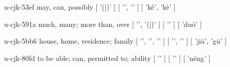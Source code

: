 \begin{multicols}{2}
\cjkgGlue{} u-cjk-53ef  may, can, possibly  [ '\cjkgGlue{}(\cjkgGlue{}|\cjkgGlue{})' ]  [ '\cjkgGlue{}', '\cjkgGlue{}' ]  [ 'k{\mktsRsgFb{}ě}', 'kè' ] 

\cjkgGlue{} u-cjk-591a  much, many; more than, over  [ '\cjkgGlue{}', '\cjkgGlue{}(\cjkgGlue{}|\cjkgGlue{})' ]  [ '\cjkgGlue{}' ]  [ 'du{\mktsRsgFb{}ō}' ] 

\cjkgGlue{} u-cjk-5bb6  house, home, residence; family  [ '\cjkgGlue{}', '\cjkgGlue{}', '\cjkgGlue{}' ]  [ '\cjkgGlue{}', '\cjkgGlue{}' ]  [ 'ji{\mktsRsgFb{}ā}', 'g{\mktsRsgFb{}ū}' ] 

\cjkgGlue{} u-cjk-80fd  to be able; can, permitted to; ability  [ '\cjkgGlue{}' ]  [ '\cjkgGlue{}' ]  [ 'néng' ] 


\end{multicols}
